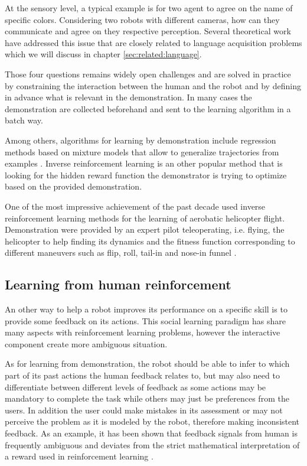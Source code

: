 \begin{itemize}
At the sensory level, a typical example is for two agent to agree on the name of specific colors. Considering two robots with different cameras, how can they communicate and agree on they respective perception. Several theoretical work have addressed this issue \cite{cangelosi2001adaptive,steels2005coordinating} that are closely related to language acquisition problems which we will discuss in chapter \ref{sec:related:language}.

\end{itemize}

Those four questions remains widely open challenges and are solved in practice by constraining the interaction between the human and the robot and by defining in advance what is relevant in the demonstration. In many cases the demonstration are collected beforehand and sent to the learning algorithm in a batch way.

Among others, algorithms for learning by demonstration include regression methods based on mixture models that allow to generalize trajectories from examples \cite{calinon07}. Inverse reinforcement learning \cite{Abbeel04icml} is an other popular method that is looking for the hidden reward function the demonstrator is trying to optimize based on the provided demonstration.

One of the most impressive achievement of the past decade used inverse reinforcement learning methods for the learning of aerobatic helicopter flight. Demonstration were provided by an expert pilot teleoperating, i.e. flying, the helicopter to help finding its dynamics and the fitness function corresponding to different maneuvers such as flip, roll, tail-in and nose-in funnel \cite{abbeel2007application}.

\subsection{Learning from human reinforcement}

An other way to help a robot improves its performance on a specific skill is to provide some feedback on its actions. This social learning paradigm has share many aspects with reinforcement learning problems, however the interactive component create more ambiguous situation. 

As for learning from demonstration, the robot should be able to infer to which part of its past actions the human feedback relates to, but may also need to differentiate between different levels of feedback as some actions may be mandatory to complete the task while others may just be preferences from the users. In addition the user could make mistakes in its assessment or may not perceive the problem as it is modeled by the robot, therefore making inconsistent feedback. As an example, it has been shown that feedback signals from human is frequently ambiguous and deviates from the strict mathematical interpretation of a reward used in reinforcement learning \cite{thomaz2008teachable,Cakmak2010optimality}.

